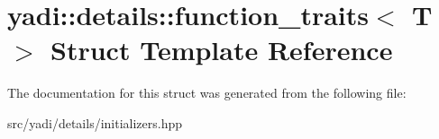 \hypertarget{structyadi_1_1details_1_1function__traits}{}\section{yadi\+:\+:details\+:\+:function\+\_\+traits$<$ T $>$ Struct Template Reference}
\label{structyadi_1_1details_1_1function__traits}


The documentation for this struct was generated from the following file\+:\begin{DoxyCompactItemize}
\item 
src/yadi/details/initializers.\+hpp\end{DoxyCompactItemize}

